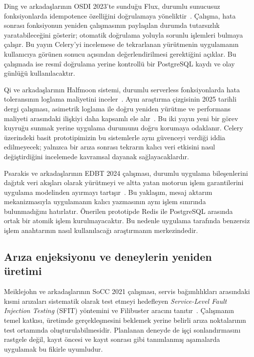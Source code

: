 \documentclass[conference,a4paper]{IEEEtran}
\newcommand{\eng}[1]{\textit{#1}}
\begin{document}
Ding ve arkadaşlarının OSDI 2023'te sunduğu Flux, durumlu sunucusuz fonksiyonlarda idempotence özelliğini doğrulamaya yöneliktir~\cite{ding2023}. Çalışma, hata sonrası fonksiyonun yeniden çalışmasının paylaşılan durumda tutarsızlık yaratabileceğini gösterir; otomatik doğrulama yoluyla sorunlu işlemleri bulmaya çalışır. Bu yayın Celery'yi incelemese de tekrarlanan yürütmenin uygulamanın kullanıcıya görünen sonucu açısından değerlendirilmesi gerektiğini açıklar. Bu çalışmada ise resmî doğrulama yerine kontrollü bir PostgreSQL kaydı ve olay günlüğü kullanılacaktır.

Qi ve arkadaşlarının Halfmoon sistemi, durumlu serverless fonksiyonlarda hata toleransının loglama maliyetini inceler~\cite{qi2023}. Aynı araştırma çizgisinin 2025 tarihli dergi çalışması, asimetrik loglama ile doğru yeniden yürütme ve performans maliyeti arasındaki ilişkiyi daha kapsamlı ele alır~\cite{qi2025}. Bu iki yayın yeni bir görev kuyruğu sunmak yerine uygulama durumunu doğru korumaya odaklanır. Celery üzerindeki basit prototipimizin bu sistemlerle aynı güvenceyi verdiği iddia edilmeyecek; yalnızca bir arıza sonrası tekrarın kalıcı veri etkisini nasıl değiştirdiğini incelemede kavramsal dayanak sağlayacaklardır.

Psarakis ve arkadaşlarının EDBT 2024 çalışması, durumlu uygulama bileşenlerini dağıtık veri akışları olarak yürütmeyi ve altta yatan motorun işlem garantilerini uygulama modelinden ayırmayı tartışır~\cite{psarakis2024}. Bu yaklaşım, mesaj aktarım mekanizmasıyla uygulamanın kalıcı yazmasının aynı işlem sınırında bulunmadığını hatırlatır. Önerilen prototipde Redis ile PostgreSQL arasında ortak bir atomik işlem kurulmayacaktır. Bu nedenle uygulama tarafında benzersiz işlem anahtarının nasıl kullanılacağı araştırmanın merkezindedir.

\subsection{Arıza enjeksiyonu ve deneylerin yeniden üretimi}
Meiklejohn ve arkadaşlarının SoCC 2021 çalışması, servis bağımlılıkları arasındaki kısmi arızaları sistematik olarak test etmeyi hedefleyen \eng{Service-Level Fault Injection Testing} (SFIT) yöntemini ve Filibuster aracını tanıtır~\cite{meiklejohn2021}. Çalışmanın temel katkısı, üretimde gerçekleşmesini beklemek yerine belirli arıza noktalarının test ortamında oluşturulabilmesidir. Planlanan deneyde de işçi sonlandırmasını rastgele değil, kayıt öncesi ve kayıt sonrası gibi tanımlanmış aşamalarda uygulamak bu fikirle uyumludur.
\end{document}
